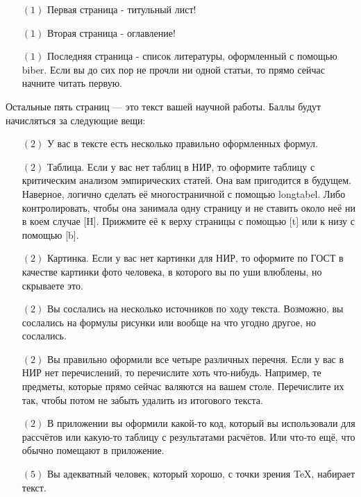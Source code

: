 \documentclass[12pt, a4paper, oneside]{article}
\begin{document}
\begin{itemize} 
\item[$(1)$] Первая страница - титульный лист!

\item[$(1)$]  Вторая страница - оглавление!

\item[$(1)$]  Последняя страница - список литературы, оформленный с помощью biber. Если вы до сих пор не прочли ни одной статьи, то прямо сейчас начните читать первую.
\end{itemize} 

Остальные пять страниц — это текст вашей научной работы. Баллы будут начисляться за следующие вещи:

\begin{itemize}
\item[$(2)$]  У вас в тексте есть несколько правильно оформленных формул.

\item[$(2)$]  Таблица. Если у вас нет таблиц в НИР, то оформите таблицу с критическим анализом эмпирических статей. Она вам пригодится в будущем. Наверное, логично сделать её многостраничной с помощью longtabel. Либо контролировать, чтобы она занимала одну страницу и не ставить около неё ни в коем случае [H]. Прижмите её к верху страницы с помощью [t] или к низу с помощью [b].

\item[$(2)$]  Картинка. Если у вас нет картинки для НИР, то оформите по ГОСТ в качестве картинки фото человека, в которого вы по уши влюблены, но скрываете это.

\item[$(2)$]  Вы сослались на несколько источников по ходу текста. Возможно, вы сослались на формулы рисунки или вообще на что угодно другое, но сослались.

\item[$(2)$]  Вы правильно оформили все четыре различных перечня. Если у вас в НИР нет перечислений, то перечислите хоть что-нибудь. Например, те предметы, которые прямо сейчас валяются на вашем столе. Перечислите их так, чтобы потом не забыть удалить из итогового текста.

\item[$(2)$]  В приложении вы оформили какой-то код, который вы использовали для рассчётов или какую-то таблицу с результатами расчётов. Или что-то ещё, что обычно помещают в приложение.

\item[$(5)$]  Вы адекватный человек, который хорошо, с точки зрения TeX, набирает текст.
\end{itemize} 



\end{document}
